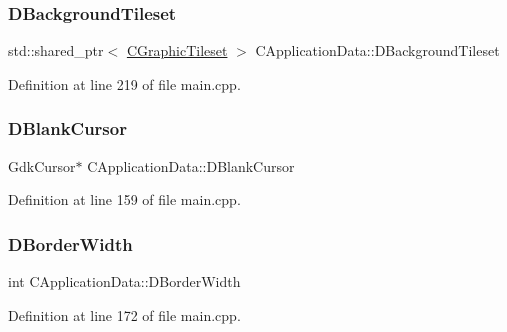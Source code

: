 \subsubsection{\texorpdfstring{D\+Background\+Tileset}{DBackgroundTileset}}
{\footnotesize\ttfamily std\+::shared\+\_\+ptr$<$ \hyperlink{classCGraphicTileset}{C\+Graphic\+Tileset} $>$ C\+Application\+Data\+::\+D\+Background\+Tileset\hspace{0.3cm}{\ttfamily [protected]}}



Definition at line 219 of file main.\+cpp.

\hypertarget{classCApplicationData_a34b9a8bb2c85704fb4bd07209acdcdc4}{}\label{classCApplicationData_a34b9a8bb2c85704fb4bd07209acdcdc4} 
\subsubsection{\texorpdfstring{D\+Blank\+Cursor}{DBlankCursor}}
{\footnotesize\ttfamily Gdk\+Cursor$\ast$ C\+Application\+Data\+::\+D\+Blank\+Cursor\hspace{0.3cm}{\ttfamily [protected]}}



Definition at line 159 of file main.\+cpp.

\hypertarget{classCApplicationData_a566b69c72fa982c6ecf8e47dc21df489}{}\label{classCApplicationData_a566b69c72fa982c6ecf8e47dc21df489} 
\subsubsection{\texorpdfstring{D\+Border\+Width}{DBorderWidth}}
{\footnotesize\ttfamily int C\+Application\+Data\+::\+D\+Border\+Width\hspace{0.3cm}{\ttfamily [protected]}}



Definition at line 172 of file main.\+cpp.

\hypertarget{classCApplicationData_accd0e5b0bf28b34b8cce8148eb13de31}{}\label{classCApplicationData_accd0e5b0bf28b34b8cce8148eb13de31} 
